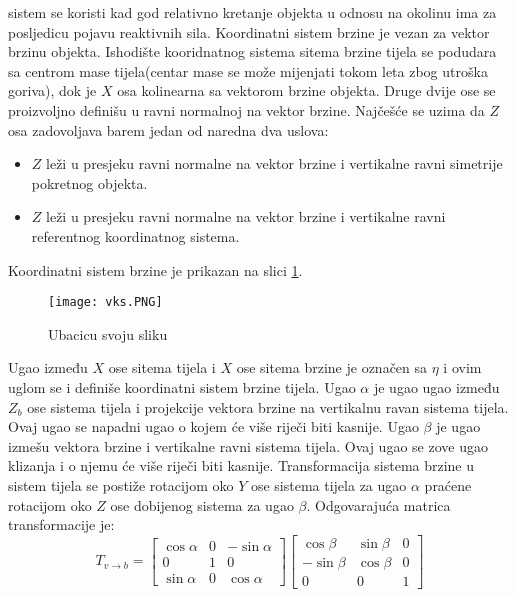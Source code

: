 sistem se koristi kad god relativno kretanje objekta u odnosu na okolinu ima za posljedicu pojavu 
reaktivnih sila. Koordinatni sistem brzine je vezan za vektor brzinu objekta. Ishodište kooridnatnog sistema 
sitema brzine tijela se podudara sa centrom mase tijela(centar mase se može mijenjati tokom leta zbog utroška goriva), dok 
je $X$ osa kolinearna sa vektorom brzine objekta. Druge dvije ose se proizvoljno definišu u ravni 
normalnoj na vektor brzine. Najčešće se uzima da $Z$ osa zadovoljava barem jedan od naredna dva uslova:
\begin{itemize}
    \item $Z$ leži u presjeku ravni normalne na vektor brzine i vertikalne ravni simetrije pokretnog objekta.
    \item $Z$ leži u presjeku ravni normalne na vektor brzine i vertikalne ravni referentnog koordinatnog sistema.
\end{itemize}
Koordinatni sistem brzine je prikazan na slici \ref{fig:vks}.
\begin{figure}[!ht]
    \centering
    \texttt{[image: vks.PNG]}
    \caption{Ubacicu svoju sliku}
    \label{fig:vks}
\end{figure}
Ugao između $X$ ose sitema tijela i $X$ ose sitema brzine je označen sa $\eta$ i ovim uglom se i definiše 
koordinatni sistem brzine tijela. Ugao $\alpha$ je ugao ugao između $Z_b$ ose  sistema tijela i projekcije 
vektora brzine na vertikalnu ravan sistema tijela. Ovaj ugao se napadni ugao o kojem će više riječi biti kasnije. 
Ugao $\beta$ je ugao izmešu vektora brzine i vertikalne ravni sistema tijela. Ovaj ugao se zove ugao klizanja i o njemu će 
više riječi biti kasnije. Transformacija sistema brzine u sistem tijela se postiže rotacijom 
oko $Y$ ose sistema tijela za ugao $\alpha$ praćene rotacijom oko $Z$ ose dobijenog sistema za ugao $\beta$. 
Odgovarajuća matrica transformacije je:
\begin{equation}
    T_{v\to b} = \begin{bmatrix}
        \cos\alpha & 0 & -\sin\alpha \\
        0& 1& 0\\
        \sin\alpha & 0 & \cos\alpha
    \end{bmatrix}
    \begin{bmatrix}
        \cos\beta & \sin\beta & 0\\
        -\sin\beta & \cos\beta & 0\\
        0 & 0& 1
    \end{bmatrix}
\end{equation}
